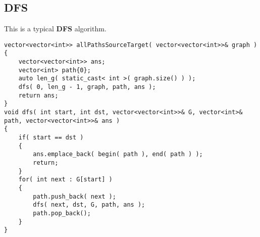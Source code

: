 \subsection{DFS}
This is a typical \textbf{DFS} algorithm.

\setcounter{lstlisting}{0}
\begin{lstlisting}[style=customc, caption={DFS}]
vector<vector<int>> allPathsSourceTarget( vector<vector<int>>& graph )
{
    vector<vector<int>> ans;
    vector<int> path{0};
    auto len_g( static_cast< int >( graph.size() ) );
    dfs( 0, len_g - 1, graph, path, ans );
    return ans;
}
void dfs( int start, int dst, vector<vector<int>>& G, vector<int>& path, vector<vector<int>>& ans )
{
    if( start == dst )
    {
        ans.emplace_back( begin( path ), end( path ) );
        return;
    }
    for( int next : G[start] )
    {
        path.push_back( next );
        dfs( next, dst, G, path, ans );
        path.pop_back();
    }
}
\end{lstlisting}

